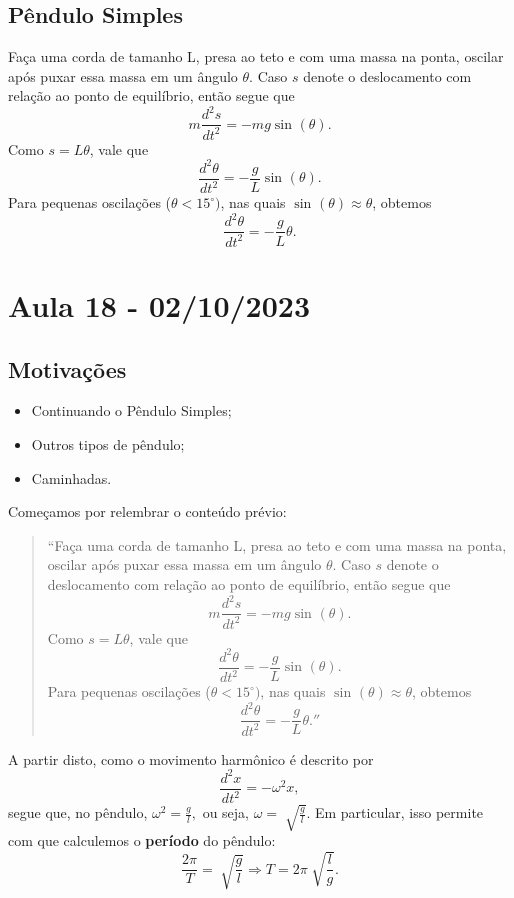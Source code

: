\documentclass{article}
\begin{document}
\subsection{Pêndulo Simples}
  Faça uma corda de tamanho L, presa ao teto e com uma massa na ponta, oscilar após puxar essa massa em um ângulo \(\theta \).
Caso \(s\) denote o deslocamento com relação ao ponto de equilíbrio, então segue que 
  \[
    m \frac{d^{2}s}{dt^{2}} = -mg\sin^{}{(\theta )}.
  \]
Como \(s = L\theta \), vale que 
  \[
    \frac{d^{2}\theta }{dt^{2}}=-\frac{g}{L}\sin^{}{(\theta )}.
  \]
  Para pequenas oscilações (\(\theta < 15^{\circ})\), nas quais \(\sin^{}{(\theta )}\approx \theta \), obtemos 
\[
  \frac{d^{2}\theta }{dt^{2}} = -\frac{g}{L}\theta .
\]
\newpage

\section{Aula 18 - 02/10/2023}
\subsection{Motivações}
\begin{itemize}
  \item Continuando o Pêndulo Simples;
  \item Outros tipos de pêndulo;
  \item Caminhadas.
\end{itemize}
  Começamos por relembrar o conteúdo prévio:
  \begin{quote}``Faça uma corda de tamanho L, presa ao teto e com uma massa na ponta, oscilar após puxar essa massa em um ângulo \(\theta \).
Caso \(s\) denote o deslocamento com relação ao ponto de equilíbrio, então segue que 
  \[
    m \frac{d^{2}s}{dt^{2}} = -mg\sin^{}{(\theta )}.
  \]
Como \(s = L\theta \), vale que 
  \[
    \frac{d^{2}\theta }{dt^{2}}=-\frac{g}{L}\sin^{}{(\theta )}.
  \]
  Para pequenas oscilações (\(\theta < 15^{\circ})\), nas quais \(\sin^{}{(\theta )}\approx \theta \), obtemos 
\[
  \frac{d^{2}\theta }{dt^{2}} = -\frac{g}{L}\theta .''
\]
\end{quote}
  A partir disto, como o movimento harmônico é descrito por 
    \[
      \frac{d^{2}x}{dt^{2}}=-\omega^{2}x,
    \]
  segue que, no pêndulo, \(\omega^{2}=\frac{g}{l},\) ou seja, \(\omega = \sqrt[]{\frac{g}{l}}.\)
Em particular, isso permite com que calculemos o \textbf{período} do pêndulo: 
  \[
    \frac{2\pi }{T} = \sqrt[]{\frac{g}{l}} \Rightarrow T = 2\pi \sqrt[]{\frac{l}{g}}.
  \]
\end{document}
